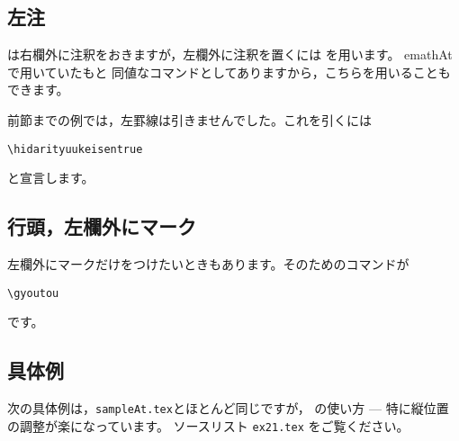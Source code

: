 \documentclass[a4j,fleqn]{jarticle}
\begin{document}
\subsection{左注}
は右欄外に注釈をおきますが，左欄外に注釈を置くには
を用います。
\textsf{emathAt}で用いていたもと
同値なコマンドとしてありますから，こちらを用いることもできます。



前節までの例では，左罫線は引きませんでした。これを引くには
\begin{jquote}
\begin{verbatim}
\hidarityuukeisentrue
\end{verbatim}
\end{jquote}
と宣言します。

\subsection{行頭，左欄外にマーク}
左欄外にマークだけをつけたいときもあります。そのためのコマンドが
\begin{jquote}
\begin{verbatim}
\gyoutou
\end{verbatim}
\end{jquote}
です。


\clearpage

\subsection{具体例}
次の具体例は，\texttt{sampleAt.tex}とほとんど同じですが，
の使い方 --- 特に縦位置の調整が楽になっています。
ソースリスト \texttt{ex21.tex} をご覧ください。

\end{document}
